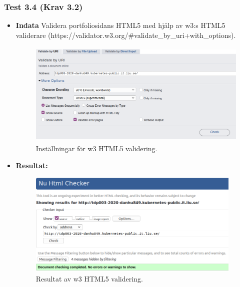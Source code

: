 \documentclass{TDP003mall}
\begin{document}
\subsubsection*{Test 3.4 (Krav 3.2)}
\begin{itemize}
\item[]\textbf{Indata} Validera portfoliosidans HTML5 med hjälp av w3:s HTML5 validerare (https://validator.w3.org/\#validate\_by\_uri+with\_options).
  \begin{figure}[h!]
\centerline{\includegraphics[width=\textwidth, height=5cm]{../Pictures/HTML5_check.png}}
\caption{Inställningar för w3 HTML5 validering.\label{fig:}}
\end{figure}
\item[]\textbf{Resultat:}
    \begin{figure}[h!]
\centerline{\includegraphics[width=\textwidth, height=5cm]{../Pictures/HTML5_check_result.png}}
\caption{Resultat av w3 HTML5 validering.\label{fig:}}
\end{figure}
\end{itemize}
\end{document}
